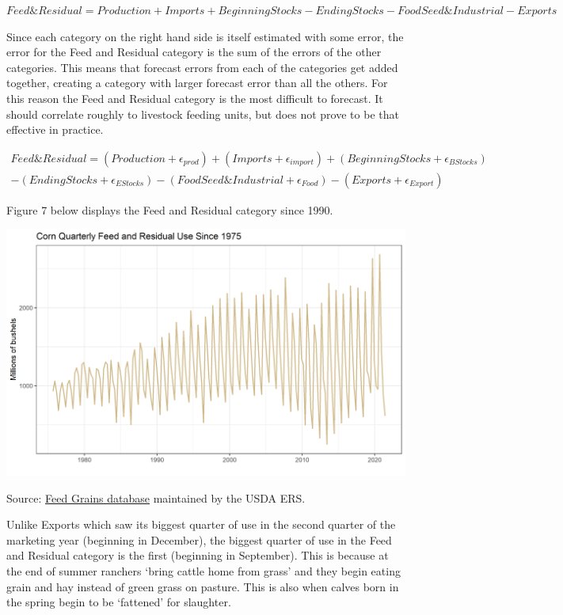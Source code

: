 \documentclass[
]{book}
\begin{document}
\(Feed\&Residual = Production + Imports + Beginning Stocks - Ending Stocks - FoodSeed\&Industrial - Exports\)

Since each category on the right hand side is itself estimated with some
error, the error for the Feed and Residual category is the sum of the
errors of the other categories. This means that forecast errors from
each of the categories get added together, creating a category with
larger forecast error than all the others. For this reason the Feed and
Residual category is the most difficult to forecast. It should correlate
roughly to livestock feeding units, but does not prove to be that
effective in practice.

\(\begin{align} Feed\&Residual = (Production + \epsilon_{prod}) + (Imports + \epsilon_{import}) + (Beginning Stocks + \epsilon_{BStocks}) \\ - (Ending Stocks + \epsilon_{EStocks}) - (FoodSeed\&Industrial + \epsilon_{Food}) - (Exports + \epsilon_{Export}) \end{align}\)

Figure 7 below displays the Feed and Residual category since 1990.

\includegraphics{assets/ForecastingUseof-CornUseCategoriesFeedResid.png}

Source: \href{http://www.ers.usda.gov/data-products/feed-grains-database/feed-grains-yearbook-tables.aspx\#26780}{Feed Grains
database}
maintained by the USDA ERS.

Unlike Exports which saw its biggest quarter of use in the second
quarter of the marketing year (beginning in December), the biggest
quarter of use in the Feed and Residual category is the first (beginning
in September). This is because at the end of summer ranchers `bring
cattle home from grass' and they begin eating grain and hay instead of
green grass on pasture. This is also when calves born in the spring
begin to be `fattened' for slaughter.
\end{document}
